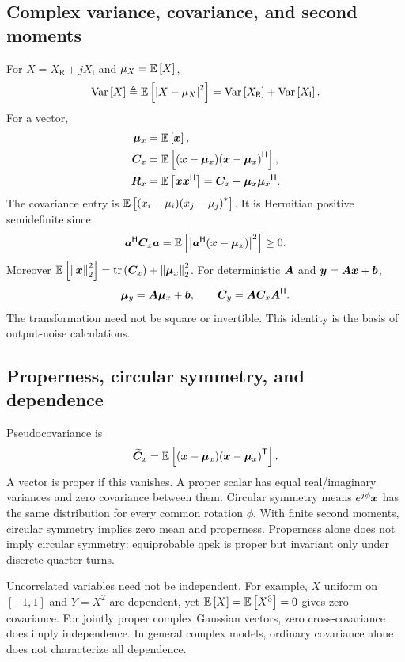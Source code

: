 \subsection{Complex variance, covariance, and second moments}
For $X=X_{\mathsf R}+jX_{\mathsf I}$ and $\mu_X=\mathbb{E}\left[X\right]$,
\begin{equation}
\operatorname{Var}\left[X\right]\triangleq\mathbb{E}\left[\left|X-\mu_X\right|^2\right]
=\operatorname{Var}\left[X_{\mathsf R}\right]+\operatorname{Var}\left[X_{\mathsf I}\right].
\end{equation}
For a vector,
\begin{align}
\bm{\mu}_x&=\mathbb{E}\left[\bm{x}\right],\\
\bm{C}_x&=\mathbb{E}\left[(\bm{x}-\bm{\mu}_x){(\bm{x}-\bm{\mu}_x)}^{\mathsf{H}}\right],\\
\bm{R}_x&=\mathbb{E}\left[\bm{x}{\bm{x}}^{\mathsf{H}}\right]=\bm{C}_x+\bm{\mu}_x{\bm{\mu}_x}^{\mathsf{H}}.
\end{align}
The covariance entry is $\mathbb{E}\left[(x_i-\mu_i){(x_j-\mu_j)}^{*}\right]$. It is Hermitian positive semidefinite since
\begin{equation}
{\bm{a}}^{\mathsf{H}}\bm{C}_x\bm{a}=\mathbb{E}\left[\left|{\bm{a}}^{\mathsf{H}}(\bm{x}-\bm{\mu}_x)\right|^2\right]\geq0.
\end{equation}
Moreover $\mathbb{E}\left[\left\|\bm{x}\right\|_2^2\right]=\operatorname{tr}\left(\bm{C}_x\right)+\left\|\bm{\mu}_x\right\|_2^2$. For deterministic $\bm{A}$ and $\bm{y}=\bm{A}\bm{x}+\bm{b}$,
\begin{equation}\label{eq:covtrans}
\bm{\mu}_y=\bm{A}\bm{\mu}_x+\bm{b},\qquad
\bm{C}_y=\bm{A}\bm{C}_x{\bm{A}}^{\mathsf{H}}.
\end{equation}
The transformation need not be square or invertible. This identity is the basis of output-noise calculations.

\subsection{Properness, circular symmetry, and dependence}
Pseudocovariance is
\begin{equation}
\widetilde{\bm{C}}_x=\mathbb{E}\left[(\bm{x}-\bm{\mu}_x){(\bm{x}-\bm{\mu}_x)}^{\mathsf{T}}\right].
\end{equation}
A vector is proper if this vanishes. A proper scalar has equal real/imaginary variances and zero covariance between them. Circular symmetry means $e^{j\phi}\bm{x}$ has the same distribution for every common rotation $\phi$. With finite second moments, circular symmetry implies zero mean and properness. Properness alone does not imply circular symmetry: equiprobable \ac{qpsk} is proper but invariant only under discrete quarter-turns.

Uncorrelated variables need not be independent. For example, $X$ uniform on $[-1,1]$ and $Y=X^2$ are dependent, yet $\mathbb{E}\left[X\right]=\mathbb{E}\left[X^3\right]=0$ gives zero covariance. For jointly proper complex Gaussian vectors, zero cross-covariance does imply independence. In general complex models, ordinary covariance alone does not characterize all dependence.

